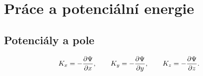 \chapter{Práce a potenciální energie}\label{fyz:chap_fey_work}
\minitoc
\newpage
  \section{Potenciály a pole}
    \begin{equation}\label{fyz:eq_fey_work31}
      K_x = - \frac{\partial \Psi}{\partial x},\qquad K_y = - \frac{\partial \Psi}{\partial y},\qquad K_z = - \frac{\partial \Psi}{\partial z}.
    \end{equation}
   